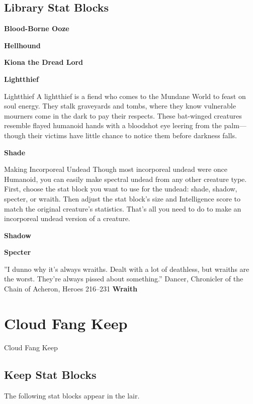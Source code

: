 \documentclass[10pt,a4paper,twoside,bg=print,twocolumn,openany,nodeprecatedcode]{dndbook}
\begin{document}
\section{Library Stat Blocks}
\textbf{Blood-Borne Ooze}

\textbf{Hellhound}

\textbf{Kiona the Dread Lord}

\textbf{Lightthief}

\begin{DndSidebar}[float=!b]{Lightthief}
A lightthief is a fiend who comes to the Mundane World to feast on soul energy. They stalk graveyards and tombs, where they know vulnerable mourners come in the dark to pay their respects. These bat-winged creatures resemble flayed humanoid hands with a bloodshot eye leering from the palm—though their victims have little chance to notice them before darkness falls.



\end{DndSidebar}

\textbf{Shade}

\begin{DndSidebar}[float=!b]{Making Incorporeal Undead}
Though most incorporeal undead were once Humanoid, you can easily make spectral undead from any other creature type. First, choose the stat block you want to use for the undead: shade, shadow, specter, or wraith. Then adjust the stat block's size and Intelligence score to match the original creature's statistics. That's all you need to do to make an incorporeal undead version of a creature.



\end{DndSidebar}

\textbf{Shadow}

\textbf{Specter}

\DndQuote%
{}
{''I dunno why it's always wraiths. Dealt with a lot of deathless, but wraiths are the worst. They're always pissed about something.''}
{Dancer, Chronicler of the Chain of Acheron, Heroes 216–231}
\textbf{Wraith}

\chapter{Cloud Fang Keep}
Cloud Fang Keep

\section{Keep Stat Blocks}
The following stat blocks appear in the lair.
\end{document}
